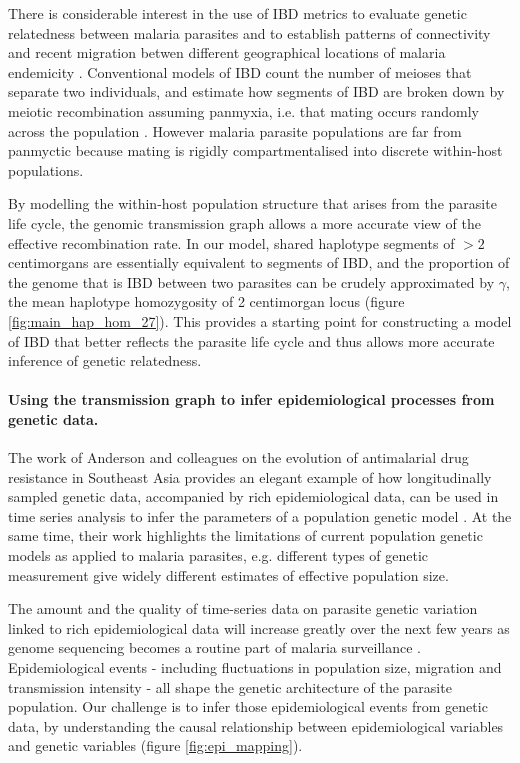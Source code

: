 \documentclass[_main.tex]{subfiles}
\begin{document}
There is considerable interest in the use of IBD metrics to evaluate genetic relatedness between malaria parasites and to establish patterns of connectivity and recent migration betwen different geographical locations of malaria endemicity \cite{Schaffner2018,Henden2018,Taylor2017,Taylor2019,Taylor2020,Gerlovina2022}.  
 Conventional models of IBD count the number of meioses that separate two individuals, and estimate how segments of IBD are broken down by meiotic recombination assuming panmyxia, i.e. that mating occurs randomly across the population \cite{Browning2012}.  However malaria parasite populations are far from panmyctic because mating is rigidly compartmentalised into discrete within-host populations.  

By modelling the within-host population structure that arises from the parasite life cycle, the genomic transmission graph allows a more accurate view of the effective recombination rate.  In our model, shared haplotype segments of $>2$ centimorgans are essentially equivalent to segments of IBD, and the proportion of the genome that is IBD between two parasites can be crudely approximated by $\gamma$, the mean haplotype homozygosity of 2 centimorgan locus (figure \ref{fig:main_hap_hom_27}).  This provides a starting point for constructing a model of IBD that better reflects the parasite life cycle and thus allows more accurate inference of genetic relatedness. 

\paragraph{Using the transmission graph to infer epidemiological processes from genetic data.}  The work of Anderson and colleagues on the evolution of antimalarial drug resistance in Southeast Asia provides an elegant example of how longitudinally sampled genetic data, accompanied by rich epidemiological data, can be used in time series analysis to infer the parameters of a population genetic model \cite{Anderson2017}.  At the same time, their work highlights the limitations of current population genetic models as applied to malaria parasites, e.g. different types of genetic measurement give widely different estimates of effective population size.

The amount and the quality of time-series data on parasite genetic variation linked to rich epidemiological data will increase greatly over the next few years as genome sequencing becomes a routine part of malaria surveillance \cite{Inzaule2021}.  Epidemiological events - including fluctuations in population size, migration and transmission intensity - all shape the genetic architecture of the parasite population.   Our challenge is to infer those epidemiological events from genetic data, by understanding the causal relationship between epidemiological variables and genetic variables (figure \ref{fig:epi_mapping}).
\end{document}
